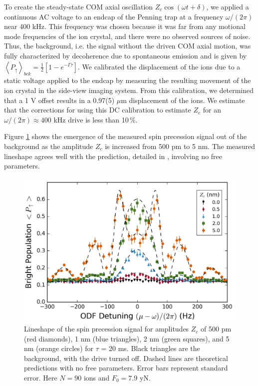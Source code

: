 \documentclass[aps,prl,twocolumn,superscriptaddress,floatfix]{revtex4-1}
\begin{document}
To create the steady-state COM axial oscillation $Z_c \cos(\omega t+\delta)$, we applied a continuous AC voltage to an endcap of the Penning trap at a frequency $\omega/(2\pi)$ near 400 kHz. This frequency was chosen because it was far from any motional mode frequencies of the ion crystal, and there were no observed sources of noise. Thus, the background, i.e. the signal without the driven COM axial motion, was fully characterized by decoherence due to spontaneous emission and is given by $\left\langle P_{\uparrow}\right\rangle _{bck}= \frac{1}{2}\left[1-e^{-\Gamma\tau}\right]$. We calibrated the displacement of the ions due to a static voltage applied to the endcap by measuring the resulting movement of the ion crystal in the side-view imaging system. From this calibration, we determined that a 1 V offset results in a 0.97(5) $\mu$m displacement of the ions. We estimate that the corrections for using this DC calibration to estimate $Z_c$ for an $\omega/(2\pi) \approx 400$ kHz drive is less than 10$\,\%$.


Figure \ref{lineshape} shows the emergence of the measured spin precession signal out of the background as the amplitude $Z_c$ is increased from 500 pm to 5 nm. The measured lineshape agrees well with the prediction, detailed in \citep{SuppMat}, involving no free parameters.

\begin{figure}
    \centering
    \includegraphics[width=\columnwidth]{lineshape}
  \caption{Lineshape of the spin precession signal for amplitudes $Z_c$ of 500 pm (red diamonds), 1 nm (blue triangles), 2 nm (green squares), and 5 nm (orange circles) for $\tau$ = 20 ms. Black triangles are the background, with the drive turned off. Dashed lines are theoretical predictions with no free parameters. Error bars represent standard error. Here $N = 90$ ions and $F_{0} = 7.9$ yN.}\label{lineshape}
\end{figure}
\end{document}
